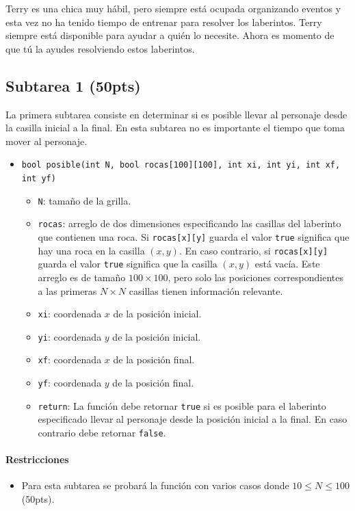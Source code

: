 \documentclass{oci}
\begin{document}
Terry es una chica muy hábil, pero siempre está ocupada organizando eventos y esta vez no ha tenido tiempo de entrenar para resolver los laberintos.
Terry siempre está disponible para ayudar a quién lo necesite.
Ahora es momento de que tú la ayudes resolviendo estos laberintos.

\subsection*{Subtarea 1 (50pts)}
La primera subtarea consiste en determinar si es posible llevar al personaje desde la casilla inicial a la final.
En esta subtarea no es importante el tiempo que toma mover al personaje.

\begin{itemize}
	\item \verb+bool posible(int N, bool rocas[100][100], int xi, int yi, int xf, int yf)+

  \begin{itemize}
    \item \verb+N+: tamaño de la grilla.
    \item \verb+rocas+: arreglo de dos dimensiones especificando las casillas del laberinto que contienen una roca.
      Si \verb+rocas[x][y]+ guarda el valor \verb+true+ significa que hay una roca en la casilla $(x,y)$.
      En caso contrario, si \verb+rocas[x][y]+ guarda el valor \verb+true+ significa que la casilla $(x,y)$ está vacía.
      Este arreglo es de tamaño $100\times 100$, pero solo las posiciones correspondientes a las primeras $N\times N$ casillas tienen información relevante.
    \item \verb+xi+: coordenada $x$ de la posición inicial.
    \item \verb+yi+: coordenada $y$ de la posición inicial.
    \item \verb+xf+: coordenada $x$ de la posición final.
    \item \verb+yf+: coordenada $y$ de la posición final.
    \item \verb+return+:
      La función debe retornar \verb+true+ si es posible para el laberinto especificado llevar al personaje desde la posición inicial a la final.
      En caso contrario debe retornar \verb+false+.
  \end{itemize}
\end{itemize}

\paragraph{Restricciones}
\begin{itemize}
\item Para esta subtarea se probará la función con varios casos donde $10 \leq N\leq 100$ (50pts).
\end{itemize}
\end{document}
